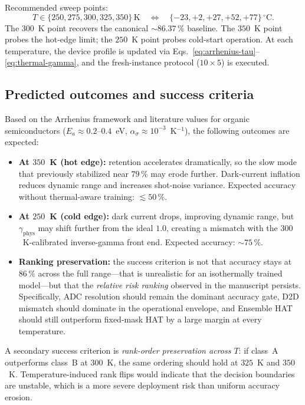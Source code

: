Recommended sweep points:
\begin{equation}
    T \in \{250, 275, 300, 325, 350\}\,\text{K}
    \quad\Longleftrightarrow\quad
    \{-23, +2, +27, +52, +77\}\,^{\circ}\mathrm{C}.
    \label{eq:temperature-sweep}
\end{equation}
The $300$~K point recovers the canonical $\sim$$86.37\,\%$ baseline.  The $350$~K point probes the hot-edge limit; the $250$~K point probes cold-start operation.  At each temperature, the device profile is updated via Eqs.~\ref{eq:arrhenius-tau}--\ref{eq:thermal-gamma}, and the fresh-instance protocol ($10 \times 5$) is executed.

\subsection{Predicted outcomes and success criteria}

Based on the Arrhenius framework and literature values for organic semiconductors ($E_{a} \approx 0.2$--$0.4$~eV, $\alpha_{\sigma} \approx 10^{-3}$~K$^{-1}$), the following outcomes are expected:
\begin{itemize}[leftmargin=1.4em]
    \item \textbf{At $350$~K (hot edge):} retention accelerates dramatically, so the slow mode that previously stabilized near $79\,\%$ may erode further.  Dark-current inflation reduces dynamic range and increases shot-noise variance.  Expected accuracy without thermal-aware training: $\lesssim 50\,\%$.
    \item \textbf{At $250$~K (cold edge):} dark current drops, improving dynamic range, but $\gamma_{\text{phys}}$ may shift further from the ideal $1.0$, creating a mismatch with the $300$~K-calibrated inverse-gamma front end.  Expected accuracy: $\sim$$75\,\%$.
    \item \textbf{Ranking preservation:} the success criterion is not that accuracy stays at $86\,\%$ across the full range---that is unrealistic for an isothermally trained model---but that the \emph{relative risk ranking} observed in the manuscript persists.  Specifically, ADC resolution should remain the dominant accuracy gate, D2D mismatch should dominate in the operational envelope, and Ensemble HAT should still outperform fixed-mask HAT by a large margin at every temperature.
\end{itemize}

A secondary success criterion is \emph{rank-order preservation across $T$}: if class~A outperforms class~B at $300$~K, the same ordering should hold at $325$~K and $350$~K.  Temperature-induced rank flips would indicate that the decision boundaries are unstable, which is a more severe deployment risk than uniform accuracy erosion.

